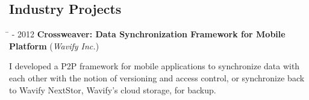 \documentclass[10pt]{article} %
\begin{document}


\subsection{Industry Projects}

\begin{tabbing}
\hspace{2.5cm} \=  - 2012 \>\+ \textbf{Crossweaver: Data Synchronization Framework for Mobile Platform} (\textit{Wavify Inc.}) \\
\begin{minipage}{\smallertextwidth}
I developed a P2P framework for mobile applications to synchronize data with
each other with the notion of versioning and access control, or synchronize
back to Wavify NextStor, Wavify's cloud storage, for backup.
\end{minipage}
\end{tabbing}
\end{document}
